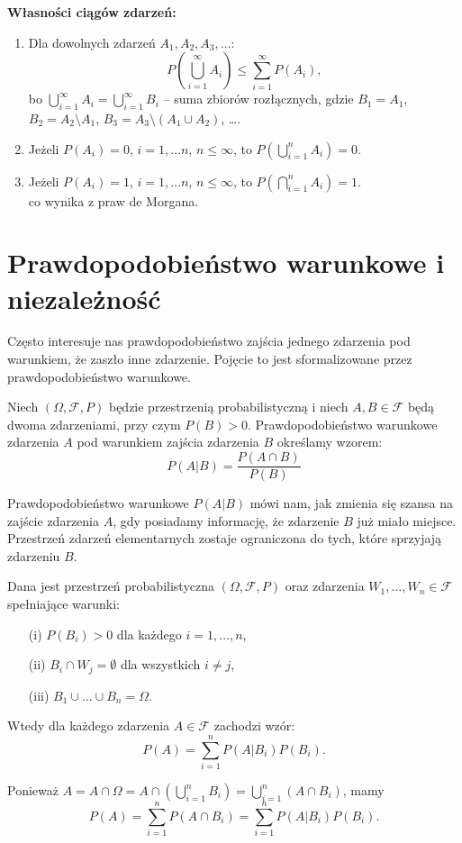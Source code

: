 \documentclass[final,a4paper,openany,12pt]{mwbk}
\begin{document}
\noindent\textbf{Własności ciągów zdarzeń:}
\begin{enumerate}
    \item Dla dowolnych zdarzeń $A_1, A_2, A_3, \dots$:
    \[ P\left(\bigcup_{i=1}^{\infty} A_i\right) \leq \sum_{i=1}^{\infty} P(A_i), \]
    bo $\bigcup_{i=1}^{\infty} A_i = \bigcup_{i=1}^{\infty} B_i$ – suma zbiorów rozłącznych, gdzie
    $B_1 = A_1$, $B_2 = A_2 \setminus A_1$, $B_3 = A_3 \setminus (A_1 \cup A_2)$, \dots.

    \item Jeżeli $P(A_i) = 0$, $i = 1, \dots n$, $n \leq \infty$, to $P\left(\bigcup_{i=1}^{n} A_i\right) = 0$.

    \item Jeżeli $P(A_i) = 1$, $i = 1, \dots n$, $n \leq \infty$, to $P\left(\bigcap_{i=1}^{n} A_i\right) = 1$. \\
    co wynika z praw de Morgana.
\end{enumerate}

\section{Prawdopodobieństwo warunkowe i niezależność}
Często interesuje nas prawdopodobieństwo zajścia jednego zdarzenia pod warunkiem, że zaszło inne zdarzenie. Pojęcie to jest sformalizowane przez prawdopodobieństwo warunkowe.

\begin{Def}
    Niech $(\Omega, \mathcal{F}, P)$ będzie przestrzenią probabilistyczną i niech $A, B \in \mathcal{F}$ będą dwoma zdarzeniami, przy czym $P(B) > 0$. Prawdopodobieństwo warunkowe zdarzenia $A$ pod warunkiem zajścia zdarzenia $B$ określamy wzorem:
    $$P(A|B) = \frac{P(A \cap B)}{P(B)}$$
\end{Def}


Prawdopodobieństwo warunkowe $P(A|B)$ mówi nam, jak zmienia się szansa na zajście zdarzenia $A$, gdy posiadamy informację, że zdarzenie $B$ już miało miejsce. Przestrzeń zdarzeń elementarnych zostaje ograniczona do tych, które sprzyjają zdarzeniu $B$.


\begin{Tw}
Dana jest przestrzeń probabilistyczna $(\Omega, \mathcal{F}, P)$ oraz zdarzenia $W_1, \dots, W_n \in \mathcal{F}$ spełniające warunki:
\begin{enumerate}
    \item[(i)] $P(B_i) > 0$ dla każdego $i = 1, \dots, n$,
    \item[(ii)] $B_i \cap W_j = \emptyset$ dla wszystkich $i \neq j$,
    \item[(iii)] $B_1 \cup \dots \cup B_n = \Omega$.
\end{enumerate}
Wtedy dla każdego zdarzenia $A \in \mathcal{F}$ zachodzi wzór:
\[
P(A) = \sum_{i=1}^{n} P(A|B_i)P(B_i).
\]
\end{Tw}
\begin{Dow}
    Ponieważ $A = A \cap \Omega = A \cap (\bigcup_{i=1}^{n} B_i) = \bigcup_{i=1}^{n} (A \cap B_i)$, mamy
\[
P(A) = \sum_{i=1}^{n} P(A \cap B_i) = \sum_{i=1}^{n} P(A|B_i)P(B_i).
\]
\end{Dow}
\end{document}
